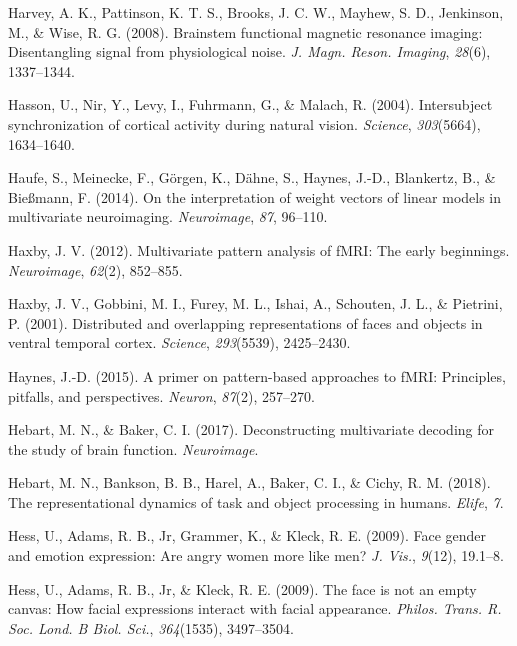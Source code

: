 \documentclass[11pt,american,]{memoir} %
\begin{document}
\leavevmode\hypertarget{ref-Harvey2008-nt}{}%
Harvey, A. K., Pattinson, K. T. S., Brooks, J. C. W., Mayhew, S. D., Jenkinson, M., \& Wise, R. G. (2008). Brainstem functional magnetic resonance imaging: Disentangling signal from physiological noise. \emph{J. Magn. Reson. Imaging}, \emph{28}(6), 1337--1344.

\leavevmode\hypertarget{ref-Hasson2004-xb}{}%
Hasson, U., Nir, Y., Levy, I., Fuhrmann, G., \& Malach, R. (2004). Intersubject synchronization of cortical activity during natural vision. \emph{Science}, \emph{303}(5664), 1634--1640.

\leavevmode\hypertarget{ref-Haufe2014-el}{}%
Haufe, S., Meinecke, F., Görgen, K., Dähne, S., Haynes, J.-D., Blankertz, B., \& Bießmann, F. (2014). On the interpretation of weight vectors of linear models in multivariate neuroimaging. \emph{Neuroimage}, \emph{87}, 96--110.

\leavevmode\hypertarget{ref-Haxby2012-sd}{}%
Haxby, J. V. (2012). Multivariate pattern analysis of fMRI: The early beginnings. \emph{Neuroimage}, \emph{62}(2), 852--855.

\leavevmode\hypertarget{ref-Haxby2001-os}{}%
Haxby, J. V., Gobbini, M. I., Furey, M. L., Ishai, A., Schouten, J. L., \& Pietrini, P. (2001). Distributed and overlapping representations of faces and objects in ventral temporal cortex. \emph{Science}, \emph{293}(5539), 2425--2430.

\leavevmode\hypertarget{ref-haynes2015primer}{}%
Haynes, J.-D. (2015). A primer on pattern-based approaches to fMRI: Principles, pitfalls, and perspectives. \emph{Neuron}, \emph{87}(2), 257--270.

\leavevmode\hypertarget{ref-Hebart2017-jn}{}%
Hebart, M. N., \& Baker, C. I. (2017). Deconstructing multivariate decoding for the study of brain function. \emph{Neuroimage}.

\leavevmode\hypertarget{ref-Hebart2018-dz}{}%
Hebart, M. N., Bankson, B. B., Harel, A., Baker, C. I., \& Cichy, R. M. (2018). The representational dynamics of task and object processing in humans. \emph{Elife}, \emph{7}.

\leavevmode\hypertarget{ref-Hess2009-jz}{}%
Hess, U., Adams, R. B., Jr, Grammer, K., \& Kleck, R. E. (2009). Face gender and emotion expression: Are angry women more like men? \emph{J. Vis.}, \emph{9}(12), 19.1--8.

\leavevmode\hypertarget{ref-Hess2009-xo}{}%
Hess, U., Adams, R. B., Jr, \& Kleck, R. E. (2009). The face is not an empty canvas: How facial expressions interact with facial appearance. \emph{Philos. Trans. R. Soc. Lond. B Biol. Sci.}, \emph{364}(1535), 3497--3504.
\end{document}
